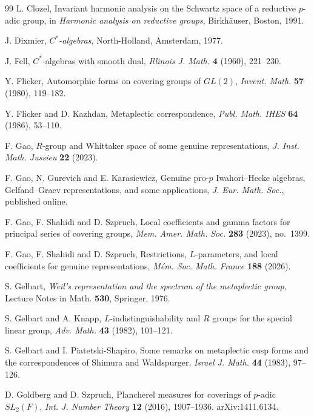 \documentclass[12pt,letterpaper]{article}
\numberwithin{equation}{section}
\theoremstyle{definition}
\begin{document}
\begin{thebibliography}{99}
 L. Clozel, Invariant harmonic analysis on the Schwartz space of a
reductive $p$-adic group, in \emph{Harmonic analysis on reductive groups}, Birkh\"auser,
Boston, 1991.

 J. Dixmier, \emph{$C^*$-algebras}, North-Holland, Amsterdam, 1977.

 J. Fell, $C^*$-algebras with smooth dual, \emph{Illinois J. Math.}
\textbf{4} (1960), 221--230.

 Y. Flicker, Automorphic forms on covering groups of $GL(2)$,
\emph{Invent. Math.} \textbf{57} (1980), 119--182.

 Y. Flicker and D. Kazhdan, Metaplectic correspondence, \emph{Publ.
Math. IHES} \textbf{64} (1986), 53--110.

 F. Gao, $R$-group and Whittaker space of some genuine
representations, \emph{J. Inst. Math. Jussieu} \textbf{22} (2023).

 F. Gao, N. Gurevich and E. Karasiewicz, Genuine pro-$p$
Iwahori--Hecke algebras, Gelfand--Graev representations, and some applications, \emph{J.
Eur. Math. Soc.}, published online.

 F. Gao, F. Shahidi and D. Szpruch, Local coefficients and gamma
factors for principal series of covering groups, \emph{Mem. Amer. Math. Soc.} \textbf{283}
(2023), no.~1399.

 F. Gao, F. Shahidi and D. Szpruch, Restrictions, $L$-parameters, and
local coefficients for genuine representations, \emph{M\'em. Soc. Math. France}
\textbf{188} (2026).

 S. Gelbart, \emph{Weil's representation and the spectrum of the
metaplectic group}, Lecture Notes in Math. \textbf{530}, Springer, 1976.

 S. Gelbart and A. Knapp, $L$-indistinguishability and $R$ groups for
the special linear group, \emph{Adv. Math.} \textbf{43} (1982), 101--121.

 S. Gelbart and I. Piatetski-Shapiro, Some remarks on metaplectic
cusp forms and the correspondences of Shimura and Waldspurger, \emph{Israel J. Math.}
\textbf{44} (1983), 97--126.

 D. Goldberg and D. Szpruch, Plancherel measures for coverings of
$p$-adic $SL_2(F)$, \emph{Int. J. Number Theory} \textbf{12} (2016), 1907--1936.
arXiv:1411.6134.


\end{thebibliography}
\end{document}

